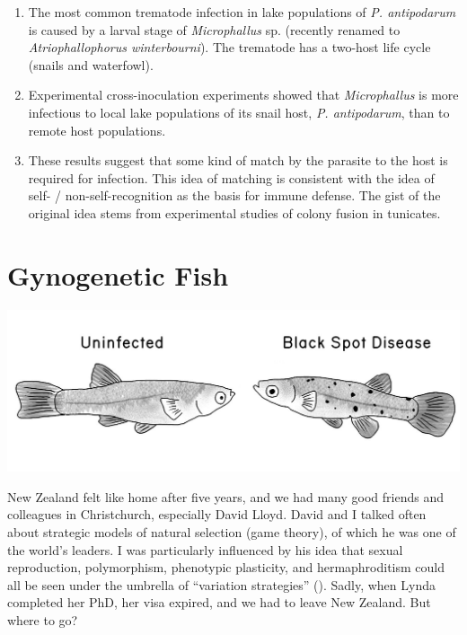 \documentclass[
  letterpaper,
]{book}
\begin{document}
\begin{enumerate}
\def\labelenumi{\arabic{enumi}.}
\item
  The most common trematode infection in lake populations of \emph{P.
  antipodarum} is caused by a larval stage of \emph{Microphallus} sp.
  (recently renamed to \emph{Atriophallophorus winterbourni}). The
  trematode has a two-host life cycle (snails and waterfowl).
\item
  Experimental cross-inoculation experiments showed that
  \emph{Microphallus} is more infectious to local lake populations of
  its snail host, \emph{P. antipodarum}, than to remote host
  populations.
\item
  These results suggest that some kind of match by the parasite to the
  host is required for infection. This idea of matching is consistent
  with the idea of self- / non-self-recognition as the basis for immune
  defense. The gist of the original idea stems from experimental studies
  of colony fusion in tunicates.
\end{enumerate}


\chapter{Gynogenetic Fish}\label{sec-gyno}

\begin{center}
\includegraphics{images/fig5-1.jpeg}
\end{center}

New Zealand felt like home after five years, and we had many good
friends and colleagues in Christchurch, especially David Lloyd. David
and I talked often about strategic models of natural selection (game
theory), of which he was one of the world's leaders. I was particularly
influenced by his idea that sexual reproduction, polymorphism,
phenotypic plasticity, and hermaphroditism could all be seen under the
umbrella of ``variation strategies'' (). Sadly, when Lynda completed her PhD, her visa expired, and we
had to leave New Zealand. But where to go?
\end{document}
